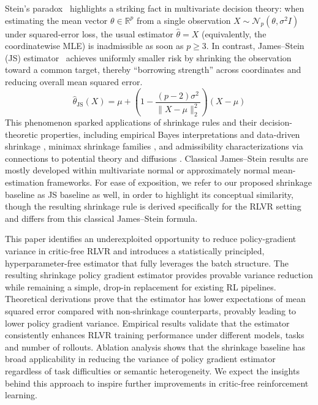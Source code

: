 \documentclass{article}
\makeatletter
\theoremstyle{plain}
\theoremstyle{definition}
\theoremstyle{remark}
\newlength{\secvspace}
\let\originalsection\section
\renewcommand{\section}{\@ifstar{\@sectionstar}{\@sectionnormal}}
\newcommand{\@sectionnormal}[1]{%
  \vspace{-\secvspace}%
  \originalsection{#1}%
  \vspace{-\secvspace}%
}
\newcommand{\@sectionstar}[1]{%
  \vspace{-\secvspace}%
  \originalsection*{#1}%
  \vspace{-\secvspace}%
}
\makeatother
\begin{document}
Stein's paradox~\citep{stein1956inadmissibility} highlights a striking fact in multivariate decision theory: when estimating the mean vector $\theta \in \mathbb{R}^p$ from a single observation $X \sim \mathcal{N}_p(\theta, \sigma^2 I)$ under squared-error loss, the usual estimator $\hat{\theta}=X$ (equivalently, the coordinatewise MLE) is inadmissible as soon as $p\ge 3$. In contrast, James--Stein (JS) estimator~\citep{stein1956inadmissibility,james1961estimation} achieves uniformly smaller risk by shrinking the observation toward a common target, thereby ``borrowing strength'' across coordinates and reducing overall mean squared error. 
\begin{equation}
\label{eq:classical-js}
\hat{\theta}_{\mathrm{JS}}(X)
= \mu + \left(1 - \frac{(p-2)\sigma^2}{\|X-\mu\|_2^2}\right)(X-\mu)
\end{equation}
This phenomenon sparked applications of shrinkage rules and their decision-theoretic properties, including empirical Bayes interpretations and data-driven shrinkage \citep{efron1973stein}, minimax shrinkage families \citep{baranchik1970family}, and admissibility characterizations via connections to potential theory and diffusions \citep{brown1971admissible,berger1976admissible}. Classical James–Stein results are mostly developed within multivariate normal or approximately normal mean-estimation frameworks. For ease of exposition, we refer to our proposed shrinkage baseline as JS baseline as well, in order to highlight its conceptual similarity, though the resulting shrinkage rule is derived specifically for the RLVR setting and differs from this classical James–Stein formula.

\section{Conclusion}

This paper identifies an underexploited opportunity to reduce policy-gradient variance in critic-free RLVR and introduces a statistically principled, hyperparameter-free estimator that fully leverages the batch structure. The resulting shrinkage policy gradient estimator provides provable variance reduction while remaining a simple, drop-in replacement for existing RL pipelines. Theoretical derivations prove that the estimator has lower expectations of mean squared error compared with non-shrinkage counterparts, provably leading to lower policy gradient variance. Empirical results validate that the estimator consistently enhances RLVR training performance under different models, tasks and number of rollouts. Ablation analysis shows that the shrinkage baseline has broad applicability in reducing the variance of policy gradient estimator regardless of task difficulties or semantic heterogeneity. We expect the insights behind this approach to inspire further improvements in critic-free reinforcement learning.
\end{document}
